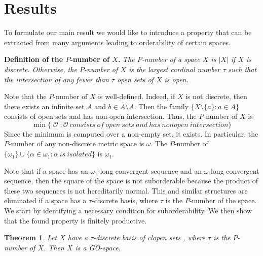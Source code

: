 \documentclass[12pt]{amsart}
\newtheorem{thm}{Theorem}[section]
\begin{document}
\section{Results}\label{S:results}
\par\bigskip
To formulate our main result we would like to introduce a property that can be extracted from many arguments leading to orderability of certain spaces.
\par\bigskip\noindent
{\bf Definition of the $P$-number of $X$.}  {\it  The $P$-number of a space $X$  is $|X|$  if $X$ is discrete. Otherwise, the $P$-number of $X$ is the largest cardinal number $\tau$ such that the intersection of any fewer than $\tau$ open sets of $X$ is open.}
\par\bigskip\noindent
Note that the $P$-number of $X$ is well-defined. Indeed, if $X$ is not discrete, then there exists an infinite set $A$ and 
$b\in \bar A\setminus A$. Then the family  $\{X\setminus \{a\}:a\in A\}$  consists of open sets and has non-open intersection. Thus, the $P$-number of $X$ is 
$$
\min\{|\mathcal O|: \mathcal O\ consists\ of \ open \ sets\ and\ has \ nonopen\ intersection\}
$$
Since the minimum is computed over a non-empty set, it exists. In particular, the $P$-number of any non-discrete metric space 
is $\omega$. The $P$-number of $\{\omega_1\}\cup \{\alpha\in\omega_1: \alpha\ is \ isolated\}$  is $\omega_1$.
\par\bigskip
Note that if a space has an $\omega_1$-long convergent sequence and an $\omega$-long convergent sequence, then the square of the space is not suborderable because the product of these two sequences is not hereditarily normal. This and similar structures are eliminated if a space has a $\tau$-discrete basis, where $\tau$ is the $P$-number of the space. We start by identifying a necessary condition for suborderability. We then show that the found property is finitely productive.
\par\bigskip\noindent
\begin{thm}\label{thm:sufficient}
Let $X$ have a $\tau$-discrete basis of clopen sets , where $\tau$ is the $P$-number of $X$. Then $X$ is a GO-space.
\end{thm}
\end{document}

